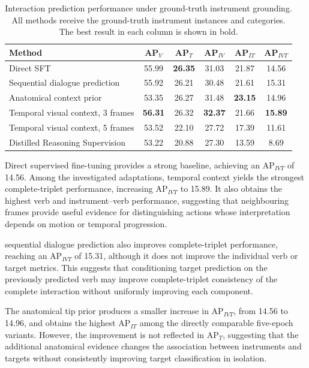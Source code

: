 \documentclass[11pt]{article}
\begin{document}
\begin{table}[t]
\centering
\caption{Interaction prediction performance under ground-truth instrument
grounding. All methods receive the ground-truth instrument instances and
categories. The best result in each column is shown in bold.}
\label{tab:gt_grounding_results}
\begin{tabular}{lccccc}
\toprule
Method
& AP$_V$
& AP$_T$
& AP$_{IV}$
& AP$_{IT}$
& AP$_{IVT}$ \\
\midrule
Direct SFT
& 55.99 & \textbf{26.35} & 31.03 & 21.87 & 14.56 \\

Sequential dialogue prediction
& 55.92 & 26.21 & 30.48 & 21.61 & 15.31 \\

Anatomical context prior
& 53.35 & 26.27 & 31.48 & \textbf{23.15} & 14.96 \\

Temporal visual context, 3 frames
& \textbf{56.31} & 26.32 & \textbf{32.37} & 21.66 & \textbf{15.89} \\

Temporal visual context, 5 frames
& 53.52 & 22.10 & 27.72 & 17.39 & 11.61 \\

Distilled Reasoning Supervision
& 53.22 & 20.88 & 27.30 & 13.59 & 8.69 \\
\bottomrule
\end{tabular}
\end{table}

Direct supervised fine-tuning provides a strong baseline, achieving an
AP$_{IVT}$ of 14.56. Among the investigated adaptations, temporal
context yields the strongest complete-triplet performance, increasing
AP$_{IVT}$ to 15.89. It also obtains the highest verb and instrument--verb
performance, suggesting that neighbouring frames provide useful evidence for
distinguishing actions whose interpretation depends on motion or temporal
progression.

sequential dialogue prediction also improves complete-triplet performance,
reaching an AP$_{IVT}$ of 15.31, although it does not improve the individual
verb or target metrics. This suggests that conditioning target prediction on the previously predicted verb may improve complete-triplet consistency of the complete
interaction without uniformly improving each component.

The anatomical tip prior produces a smaller increase in AP$_{IVT}$, from 14.56
to 14.96, and obtains the highest AP$_{IT}$ among the directly comparable
five-epoch variants. However, the improvement is not reflected in AP$_T$,
suggesting that the additional anatomical evidence changes the association
between instruments and targets without consistently improving target
classification in isolation.
\end{document}
